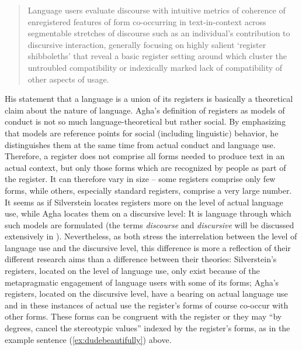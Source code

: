 \begin{quote}
Language users evaluate discourse with intuitive metrics of coherence of enregistered features of form co-occurring in text-in-context across segmentable stretches of discourse such as an individual’s contribution to discursive interaction, generally focusing on highly salient ‘register shibboleths’ that reveal a basic register setting around which cluster the untroubled compatibility or indexically marked lack of compatibility of other aspects of usage. \citep[59--60]{Silverstein2016}
\end{quote}


His statement that a language is a union of its registers is basically a theoretical claim about the nature of language. Agha’s definition of registers as models of conduct is not so much language-theoretical but rather social. By emphasizing that models are reference points for social (including linguistic) behavior, he distinguishes them at the same time from actual conduct and language use. Therefore, a register does not comprise all forms needed to produce text in an actual context, but only those forms which are recognized by people as part of the register. It can therefore vary in size – some registers comprise only few forms, while others, especially standard registers, comprise a very large number. It seems as if Silverstein locates registers more on the level of actual language use, while Agha locates them on a discursive level: It is language through which such models are formulated (the terms \textit{discourse} and \textit{discursive} will be discussed extensively in ). Nevertheless, as both stress the interrelation between the level of language use and the discursive level, this difference is more a reflection of their different research aims than a difference between their theories: Silverstein’s registers, located on the level of language use, only exist because of the metapragmatic engagement of language users with some of its forms; Agha’s registers, located on the discursive level, have a bearing on actual language use and in these instances of actual use the register’s forms of course co-occur with other forms. These forms can be congruent with the register or they may “by degrees, cancel the stereotypic values” indexed by the register’s forms, as in the example sentence (\ref{ex:dudebeautifully}) above.


